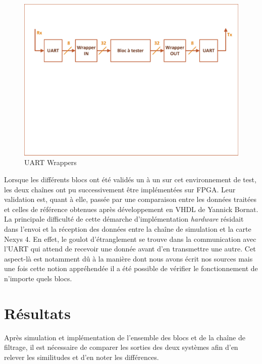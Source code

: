 \documentclass[a4paper,12pt]{article}
\begin{document}
\begin{figure}[H]
\centering
\includegraphics[width=\textwidth]{Dessin7.pdf}
\caption{UART Wrappers}
\end{figure}   

Lorsque les différents blocs ont été validés un à un sur cet environnement de test, les deux chaînes ont pu successivement être implémentées sur FPGA. Leur validation est, quant à elle, passée par une comparaison entre les données traitées et celles de référence obtenues après développement en VHDL de Yannick Bornat. La principale difficulté de cette démarche d'implémentation \textit{hardware} résidait dans l'envoi et la réception des données entre la chaîne de simulation et la carte Nexys 4. En effet, le goulot d'étranglement se trouve dans la communication avec l'UART qui attend de recevoir une donnée avant d'en transmettre une autre. Cet aspect-là est notamment dû à la manière dont nous avons écrit nos sources mais une fois cette notion appréhendée il a été possible de vérifier le fonctionnement de n'importe quels blocs.
\newpage
\section{Résultats}
Après simulation et implémentation de l'ensemble des blocs et de la chaîne de filtrage, il est nécessaire de comparer les sorties des deux systèmes afin d'en relever les similitudes et d'en noter les différences.
\end{document}
